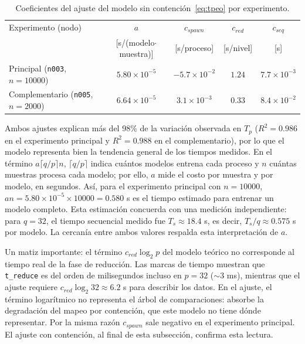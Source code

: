 \documentclass[11pt, a4paper]{article}
\begin{document}
\begin{table}[H]
\centering
\small
\caption{Coeficientes del ajuste del modelo sin contención~\eqref{eq:tpeo} por experimento.}
\begin{tabular}{lcccc}
\toprule
Experimento (nodo) & $a$ & $c_{spawn}$ & $c_{red}$ & $c_{seq}$ \\
 & {\scriptsize[s/(modelo$\cdot$muestra)]} & {\scriptsize[s/proceso]} & {\scriptsize[s/nivel]} & {\scriptsize[s]} \\
\midrule
Principal (\texttt{n003}, $n=10000$) & $5.80 \times 10^{-5}$ & $-5.7 \times 10^{-2}$ & $1.24$ & $7.7 \times 10^{-3}$ \\
Complementario (\texttt{n005}, $n=2000$) & $6.64 \times 10^{-5}$ & $3.1 \times 10^{-3}$ & $0.33$ & $8.4 \times 10^{-2}$ \\
\bottomrule
\end{tabular}
\end{table}

Ambos ajustes explican más del 98\% de la variación observada en $T_p$ ($R^2 = 0.986$ en el experimento principal y $R^2 = 0.988$ en el complementario), por lo que el modelo representa bien la tendencia general de los tiempos medidos. En el término $a\lceil q/p\rceil n$, $\lceil q/p\rceil$ indica cuántos modelos entrena cada proceso y $n$ cuántas muestras procesa cada modelo; por ello, $a$ mide el costo por muestra y por modelo, en segundos. Así, para el experimento principal con $n=10000$, $a n = 5.80\times10^{-5}\times10000 = 0.580$ s es el tiempo estimado para entrenar un modelo completo. Esta estimación concuerda con una medición independiente: para $q=32$, el tiempo secuencial medido fue $T_s\approx18.4$ s, es decir, $T_s/q\approx0.575$ s por modelo. La cercanía entre ambos valores respalda esta interpretación de $a$.

Un matiz importante: el término $c_{red} \log_2 p$ del modelo teórico no corresponde al tiempo real de la fase de reducción. Las marcas de tiempo muestran que \texttt{t\_reduce} es del orden de milisegundos incluso en $p = 32$ ($\sim$3 ms), mientras que el ajuste requiere $c_{red} \log_2 32 \approx 6.2$ s para describir los datos. En el ajuste, el término logarítmico no representa el árbol de comparaciones: absorbe la degradación del mapeo por contención, que este modelo no tiene dónde representar. Por la misma razón $c_{spawn}$ sale negativo en el experimento principal. El ajuste con contención, al final de esta subsección, confirma esta lectura.
\end{document}

